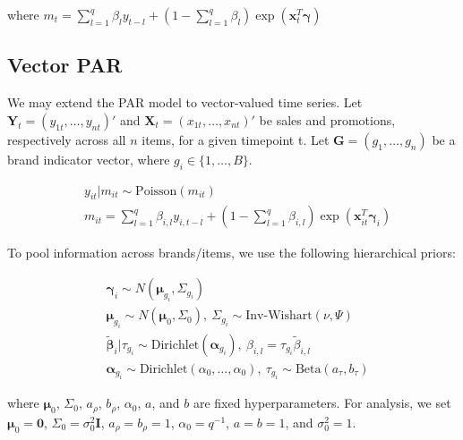 \documentclass{article}
\begin{document}
\noindent where $m_t = \sum_{l=1}^q \beta_{l} y_{t-l} + \left(1-\sum_{l=1}^q \beta_l \right) \exp(\mathbf{x}_t^T \boldsymbol{\gamma})$

\subsection*{Vector PAR}
\noindent We may extend the PAR model to vector-valued time series. Let $\mathbf{Y}_t=(y_{1t},\ldots,y_{nt})'$ and $\mathbf{X}_t = (x_{1t},\ldots,x_{nt})'$ be sales and promotions, respectively across all $n$ items, for a given timepoint t. Let $\mathbf{G}=(g_1,\ldots,g_n)$ be a brand indicator vector, where $g_i \in \{1,\ldots,B\}$.

\begin{align*}
    & y_{it} | m_{it} \sim \text{Poisson}(m_{it}) \\
    & m_{it} = \sum_{l=1}^q \beta_{i,l} y_{i,t-l}+\left(1-\sum_{l=1}^q \beta_{i,l} \right) \exp(\mathbf{x}_{it}^T  \boldsymbol{\gamma}_i)
\end{align*}

\noindent To pool information across brands/items, we use the following hierarchical priors:

\begin{align*}
    & \boldsymbol{\gamma}_i \sim N(\boldsymbol{\mu}_{g_i}, \Sigma_{g_i}) \\
    & \boldsymbol{\mu}_{g_i} \sim N(\boldsymbol{\mu}_0, \Sigma_0), \ \Sigma_{g_i} \sim \text{Inv-Wishart}(\nu, \Psi) \\
    & \tilde{\boldsymbol{\beta}}_i | \tau_{g_i} \sim \text{Dirichlet}(\boldsymbol{\alpha}_{g_i}), \ \beta_{i,l}=\tau_{g_i} \tilde{\beta}_{i,l} \\
    & \boldsymbol{\alpha}_{g_i} \sim \text{Dirichlet}(\alpha_0, \ldots, \alpha_0) , \ \tau_{g_i} \sim \text{Beta}(a_{\tau},b_{\tau})
\end{align*}

\noindent where $\boldsymbol{\mu}_0$, $\Sigma_0$, $a_{\rho}$, $b_{\rho}$, $\alpha_0$, $a$, and $b$ are fixed hyperparameters. For analysis, we set $\boldsymbol{\mu}_0=\boldsymbol{0}$, $\Sigma_0=\sigma_0^2 \mathbf{I}$, $a_{\rho}=b_{\rho}=1$, $\alpha_0=q^{-1}$, $a=b=1$, and $\sigma_0^2=1$.
\end{document}
